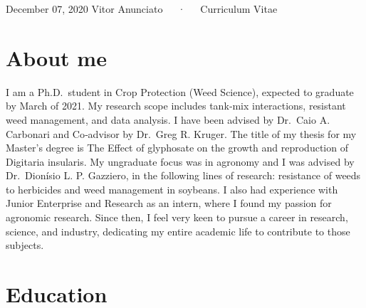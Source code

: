 \documentclass[11pt, a4paper]{awesome-cv}
\begin{document}
\makecvheader

\makecvfooter
  {December 07, 2020}
    {Vitor Anunciato~~~·~~~Curriculum Vitae}
  {\thepage}





\hypertarget{about-me}{%
\section{About me}\label{about-me}}

I am a Ph.D.~student in Crop Protection (Weed Science), expected to
graduate by March of 2021. My research scope includes tank‑mix
interactions, resistant weed management, and data analysis. I have been
advised by Dr.~Caio A. Carbonari and Co‑advisor by Dr.~Greg R. Kruger.
The title of my thesis for my Master's degree is The Effect of
glyphosate on the growth and reproduction of Digitaria insularis. My
ungraduate focus was in agronomy and I was advised by Dr.~Dionísio L. P.
Gazziero, in the following lines of research: resistance of weeds to
herbicides and weed management in soybeans. I also had experience with
Junior Enterprise and Research as an intern, where I found my passion
for agronomic research. Since then, I feel very keen to pursue a career
in research, science, and industry, dedicating my entire academic life
to contribute to those subjects.

\hypertarget{education}{%
\section{Education}\label{education}}
\end{document}
